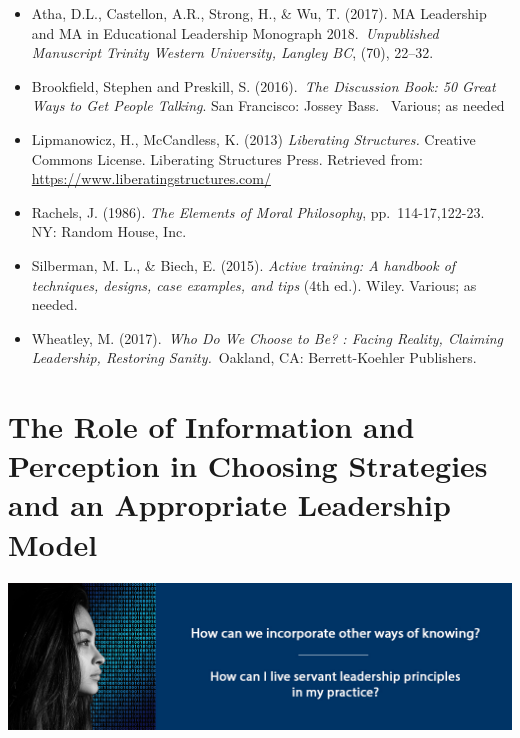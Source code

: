 \documentclass[
]{book}
\providecommand{\tightlist}{%
  \setlength{\itemsep}{0pt}\setlength{\parskip}{0pt}}
\begin{document}
\begin{itemize}
\tightlist
\item
  Atha, D.L., Castellon, A.R., Strong, H., \& Wu, T. (2017). MA Leadership and MA in Educational Leadership Monograph 2018.~\emph{Unpublished Manuscript Trinity Western University, Langley BC}, (70), 22--32.\\
\item
  Brookfield, Stephen and Preskill, S. (2016).~\emph{The Discussion Book: 50 Great Ways to Get People Talking}. San Francisco: Jossey Bass. ~Various; as needed\\
\item
  Lipmanowicz, H., McCandless, K. (2013) \emph{Liberating Structures.} Creative Commons License. Liberating Structures Press. Retrieved from: \url{https://www.liberatingstructures.com/}\\
\item
  Rachels, J. (1986). \emph{The Elements of Moral Philosophy}, pp.~114-17,122-23. NY: Random House, Inc.\\
\item
  Silberman, M. L., \& Biech, E. (2015). \emph{Active training: A handbook of techniques, designs, case examples, and tips} (4th ed.). Wiley. Various; as needed.\\
\item
  Wheatley, M. (2017).~\emph{Who Do We Choose to Be? : Facing Reality, Claiming Leadership, Restoring Sanity.}~Oakland, CA: Berrett-Koehler Publishers.
\end{itemize}

\hypertarget{the-role-of-information-and-perception-in-choosing-strategies-and-an-appropriate-leadership-model}{%
\chapter{The Role of Information and Perception in Choosing Strategies and an Appropriate Leadership Model}\label{the-role-of-information-and-perception-in-choosing-strategies-and-an-appropriate-leadership-model}}

\includegraphics{assets/unit7/BannerUnit7.jpg}
\end{document}
